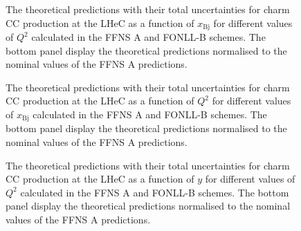 \documentclass[pdftex,twocolumn,epjc3]{svjour3}          %
\newcommand{\xbj}{\ensuremath{x_{\text{Bj}}}\xspace}
\newcommand{\fonll} {{FONLL-B}\xspace}
\newcommand{\ffns} {{FFNS A}\xspace}
\begin{document}
\begin{figure}
    \centering
    \caption{The theoretical predictions with their total uncertainties for charm CC production at the LHeC as a function of \xbj for different values of $Q^2$ calculated in the \ffns and \fonll schemes. The bottom panel display the theoretical predictions normalised to the nominal values of the \ffns predictions.}
    \label{fig:thpred-x}
\end{figure}

\begin{figure}
    \centering
    \caption{The theoretical predictions with their total uncertainties for charm CC production at the LHeC as a function of $Q^2$ for different values of \xbj calculated in the \ffns and \fonll schemes. The bottom panel display the theoretical predictions normalised to the nominal values of the \ffns predictions.}
    \label{fig:thpred-q2}
\end{figure}

\begin{figure}
    \centering
    \caption{The theoretical predictions with their total uncertainties for charm CC production at the LHeC as a function of $y$ for different values of $Q^2$ calculated in the \ffns and \fonll schemes. The bottom panel display the theoretical predictions normalised to the nominal values of the \ffns predictions.}
    \label{fig:thpred-y}
\end{figure}
\end{document}
